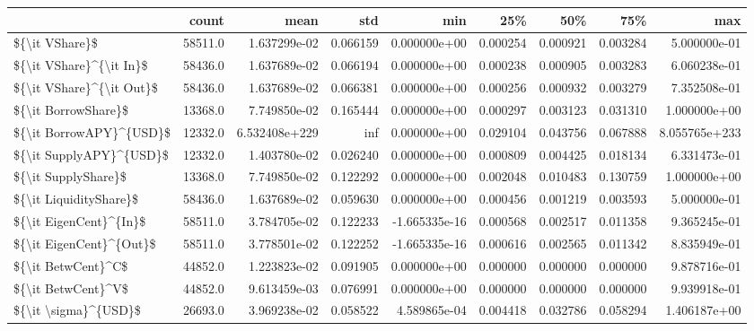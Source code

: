 \begin{tabular}{lrrrrrrrr}
\toprule
{} &    count &           mean &       std &           min &       25\% &       50\% &       75\% &            max \\
\midrule
\$\{\textbackslash it VShare\}\$           &  58511.0 &   1.637299e-02 &  0.066159 &  0.000000e+00 &  0.000254 &  0.000921 &  0.003284 &   5.000000e-01 \\
\$\{\textbackslash it VShare\}\textasciicircum \{\textbackslash it In\}\$  &  58436.0 &   1.637689e-02 &  0.066194 &  0.000000e+00 &  0.000238 &  0.000905 &  0.003283 &   6.060238e-01 \\
\$\{\textbackslash it VShare\}\textasciicircum \{\textbackslash it Out\}\$ &  58436.0 &   1.637689e-02 &  0.066381 &  0.000000e+00 &  0.000256 &  0.000932 &  0.003279 &   7.352508e-01 \\
\$\{\textbackslash it BorrowShare\}\$      &  13368.0 &   7.749850e-02 &  0.165444 &  0.000000e+00 &  0.000297 &  0.003123 &  0.031310 &   1.000000e+00 \\
\$\{\textbackslash it BorrowAPY\}\textasciicircum \{USD\}\$  &  12332.0 &  6.532408e+229 &       inf &  0.000000e+00 &  0.029104 &  0.043756 &  0.067888 &  8.055765e+233 \\
\$\{\textbackslash it SupplyAPY\}\textasciicircum \{USD\}\$  &  12332.0 &   1.403780e-02 &  0.026240 &  0.000000e+00 &  0.000809 &  0.004425 &  0.018134 &   6.331473e-01 \\
\$\{\textbackslash it SupplyShare\}\$      &  13368.0 &   7.749850e-02 &  0.122292 &  0.000000e+00 &  0.002048 &  0.010483 &  0.130759 &   1.000000e+00 \\
\$\{\textbackslash it LiquidityShare\}\$   &  58436.0 &   1.637689e-02 &  0.059630 &  0.000000e+00 &  0.000456 &  0.001219 &  0.003593 &   5.000000e-01 \\
\$\{\textbackslash it EigenCent\}\textasciicircum \{In\}\$   &  58511.0 &   3.784705e-02 &  0.122233 & -1.665335e-16 &  0.000568 &  0.002517 &  0.011358 &   9.365245e-01 \\
\$\{\textbackslash it EigenCent\}\textasciicircum \{Out\}\$  &  58511.0 &   3.778501e-02 &  0.122252 & -1.665335e-16 &  0.000616 &  0.002565 &  0.011342 &   8.835949e-01 \\
\$\{\textbackslash it BetwCent\}\textasciicircum C\$       &  44852.0 &   1.223823e-02 &  0.091905 &  0.000000e+00 &  0.000000 &  0.000000 &  0.000000 &   9.878716e-01 \\
\$\{\textbackslash it BetwCent\}\textasciicircum V\$       &  44852.0 &   9.613459e-03 &  0.076991 &  0.000000e+00 &  0.000000 &  0.000000 &  0.000000 &   9.939918e-01 \\
\$\{\textbackslash it \textbackslash sigma\}\textasciicircum \{USD\}\$     &  26693.0 &   3.969238e-02 &  0.058522 &  4.589865e-04 &  0.004418 &  0.032786 &  0.058294 &   1.406187e+00 \\
\bottomrule
\end{tabular}
